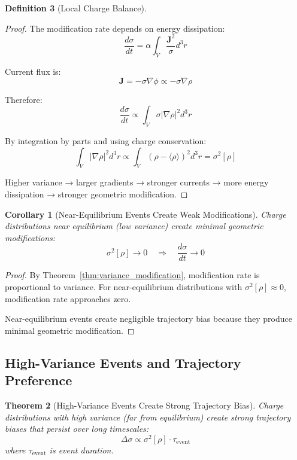 \documentclass[12pt,a4paper]{article}
\theoremstyle{plain}
\newtheorem{theorem}{Theorem}[section]
\newtheorem{corollary}[theorem]{Corollary}
\theoremstyle{definition}
\newtheorem{definition}[theorem]{Definition}
\theoremstyle{remark}
\begin{document}
\begin{definition}[Local Charge Balance]
\begin{proof}
The modification rate depends on energy dissipation:
\begin{equation}
\frac{d\sigma}{dt} = \alpha \int_V \frac{\mathbf{J}^2}{\sigma} d^3r
\end{equation}

Current flux is:
\begin{equation}
\mathbf{J} = -\sigma \nabla \phi \propto -\sigma \nabla \rho
\end{equation}

Therefore:
\begin{equation}
\frac{d\sigma}{dt} \propto \int_V \sigma |\nabla \rho|^2 d^3r
\end{equation}

By integration by parts and using charge conservation:
\begin{equation}
\int_V |\nabla \rho|^2 d^3r \propto \int_V (\rho - \langle \rho \rangle)^2 d^3r = \sigma^2[\rho]
\end{equation}

Higher variance → larger gradients → stronger currents → more energy dissipation → stronger geometric modification.
\end{proof}

\begin{corollary}[Near-Equilibrium Events Create Weak Modifications]
\label{cor:near_equilibrium_weak}
Charge distributions near equilibrium (low variance) create minimal geometric modifications:
\begin{equation}
\sigma^2[\rho] \to 0 \quad \Rightarrow \quad \frac{d\sigma}{dt} \to 0
\end{equation}
\end{corollary}

\begin{proof}
By Theorem~\ref{thm:variance_modification}, modification rate is proportional to variance. For near-equilibrium distributions with $\sigma^2[\rho] \approx 0$, modification rate approaches zero.

Near-equilibrium events create negligible trajectory bias because they produce minimal geometric modification.
\end{proof}

\subsection{High-Variance Events and Trajectory Preference}

\begin{theorem}[High-Variance Events Create Strong Trajectory Bias]
\label{thm:high_variance_bias}
Charge distributions with high variance (far from equilibrium) create strong trajectory biases that persist over long timescales:
\begin{equation}
\Delta \sigma \propto \sigma^2[\rho] \cdot \tau_{\text{event}}
\end{equation}
where $\tau_{\text{event}}$ is event duration.
\end{theorem}


\end{definition}
\end{document}

